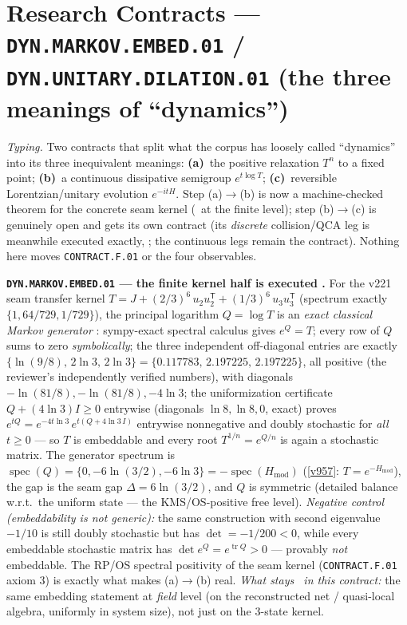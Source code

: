 \documentclass[11pt,a4paper]{article}
\begin{document}
\section*{Research Contracts --- \texttt{DYN.MARKOV.EMBED.01} / \texttt{DYN.UNITARY.DILATION.01} (the three meanings of ``dynamics'')}
\noindent\emph{Typing.} Two contracts that split what the corpus has loosely called ``dynamics''
into its three inequivalent meanings: \textbf{(a)}~the positive relaxation $T^n$ to a fixed
point; \textbf{(b)}~a continuous dissipative semigroup $e^{t\log T}$; \textbf{(c)}~reversible
Lorentzian/unitary evolution $e^{-itH}$.  Step (a)$\to$(b) is now a machine-checked theorem for
the concrete seam kernel (\mE\ at the finite level); step (b)$\to$(c) is genuinely open and gets
its own contract (its \emph{discrete} collision/QCA leg is meanwhile executed exactly,
; the continuous legs remain the contract).  Nothing here
moves \texttt{CONTRACT.F.01} or the four observables.

\par\smallskip\noindent\textbf{\texttt{DYN.MARKOV.EMBED.01} --- the finite kernel half is
executed \mE.}  For the v221 seam transfer
kernel $T=J+(2/3)^6\,u_2u_2^{\mathsf T}+(1/3)^6\,u_3u_3^{\mathsf T}$ (spectrum exactly
$\{1,64/729,1/729\}$), the principal logarithm $Q=\log T$ is an \emph{exact classical Markov
generator} : sympy-exact spectral calculus gives
$e^Q=T$; every row of $Q$ sums to zero
\emph{symbolically}; the three independent off-diagonal entries are exactly
$\{\ln(9/8),\,2\ln 3,\,2\ln 3\}=\{0.117783,\,2.197225,\,2.197225\}$, all positive (the reviewer's
independently verified numbers), with diagonals $-\ln(81/8),-\ln(81/8),-4\ln3$; the
uniformization certificate $Q+(4\ln3)I\ge0$ entrywise (diagonals $\ln8,\ln8,0$, exact) proves
$e^{tQ}=e^{-4t\ln3}\,e^{t(Q+4\ln3\,I)}$ entrywise nonnegative and doubly stochastic for
\emph{all} $t\ge0$ --- so $T$ is embeddable and every root $T^{1/n}=e^{Q/n}$ is again a
stochastic matrix.  The generator spectrum is
$\operatorname{spec}(Q)=\{0,-6\ln(3/2),-6\ln3\}=-\operatorname{spec}(H_{\mathrm{mod}})$
(\vref{v957}: $T=e^{-H_{\mathrm{mod}}}$), the gap is the seam gap $\Delta=6\ln(3/2)$, and $Q$ is
symmetric (detailed balance w.r.t.\ the uniform state --- the KMS/OS-positive free level).
\emph{Negative control (embeddability is not generic):} the same construction with second
eigenvalue $-1/10$ is still doubly stochastic but has $\det=-1/200<0$, while every embeddable
stochastic matrix has $\det e^Q=e^{\operatorname{tr}Q}>0$ --- provably \emph{not} embeddable.
The RP/OS spectral positivity of the seam kernel (\texttt{CONTRACT.F.01} axiom 3) is exactly
what makes (a)$\to$(b) real.  \emph{What stays \mO\ in this contract:} the same embedding
statement at \emph{field} level (on the reconstructed net / quasi-local algebra, uniformly in
system size), not just on the 3-state kernel.
\end{document}
